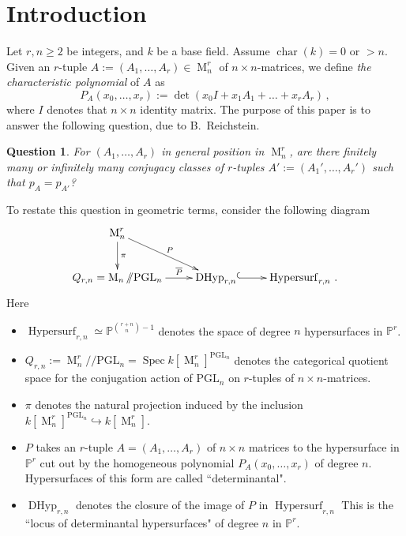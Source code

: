 \documentclass[12pt]{amsart}
\numberwithin{equation}{section}
\numberwithin{subsection}{section}
\newtheorem{question}[theorem]{Question}
\theoremstyle{definition} \newtheorem{definition}[theorem]{Definition}
\newcommand\Char{\operatorname{char}}
\newcommand\Hypersurf{\operatorname{Hypersurf}}
\newcommand\DHyp{\operatorname{DHyp}}
\newcommand{\PGL}{\mathrm{PGL}}
\newcommand\Spec{\operatorname{Spec}}
\newcommand{\Mat}{\operatorname{M}}
\newcommand{\bbP}{\mathbb{P}}
\begin{document}
\section{Introduction}

Let $r, n \geqslant 2$ be integers, and $k$ be a base field.
Assume $\Char(k) = 0$ or $> n$.  Given an 
$r$-tuple $A := (A_1, \dots, A_r) \in \Mat_n^r$ 
of $n \times n$-matrices, we define {\em the characteristic polynomial}
of $A$ as
\[ P_A(x_0, \dots, x_r) := \det(x_0 I + x_1 A_1 + \dots + x_r A_r) \, , \]
where $I$ denotes that $n \times n$ identity matrix.
The purpose of this paper is to answer the following question,
due to B.~Reichstein. 

\begin{question} \label{q1}
For $(A_1, \dots, A_r)$ in general position in
$\Mat_n^r$, are there finitely many or infinitely many
conjugacy classes of $r$-tuples 
$A' := (A_1', \dots, A_r')$ such that $p_A = p_{A'}$?
\end{question}

To restate this question in geometric terms, consider the following 
diagram
\begin{equation} \label{e.main-diagram}
\xymatrix{ %
\Mat_n^r  \ar[dr]^P \ar[d]^{\pi} & &   \\
   Q_{r, n}= \Mat_n/\! \!/\PGL_n \ar[r]^-{\quad \overline{P} \quad} & \DHyp_{r, n} \ar@{^{(}->}[r] & 
 \Hypersurf_{r, n} \, .}  
\end{equation}
Here 
\begin{itemize}
\item $\Hypersurf_{r, n} \simeq \bbP^{\binom{r + n}{n} - 1}$ 
denotes the space of degree $n$
hypersurfaces in $\bbP^r$.  

\item
$Q_{r, n} := \Mat_n^r/\! \!/\PGL_n = \Spec k[\Mat_n^r]^{\PGL_n}$ denotes the 
categorical quotient space for the conjugation action of $\PGL_n$ on
$r$-tuples of $n \times n$-matrices.

\item
$\pi$ denotes the natural projection induced by the inclusion 
$k[\Mat_n^r]^{\PGL_n} \hookrightarrow k[\Mat_n^r]$.

\item
$P$ takes an $r$-tuple $A = (A_1, \dots, A_r)$ of $n \times n$ matrices
to the hypersurface in $\bbP^r$ cut out 
by the homogeneous polynomial $P_A(x_0, \dots, x_r)$ of degree $n$. 
Hypersurfaces of this form are called ``determinantal".

\item
$\DHyp_{r, n}$ denotes the closure of the image of $P$ in $\Hypersurf_{r, n}$
This is the ``locus of determinantal hypersurfaces" 
of degree $n$ in $\bbP^r$.
\end{itemize}
\end{document}
